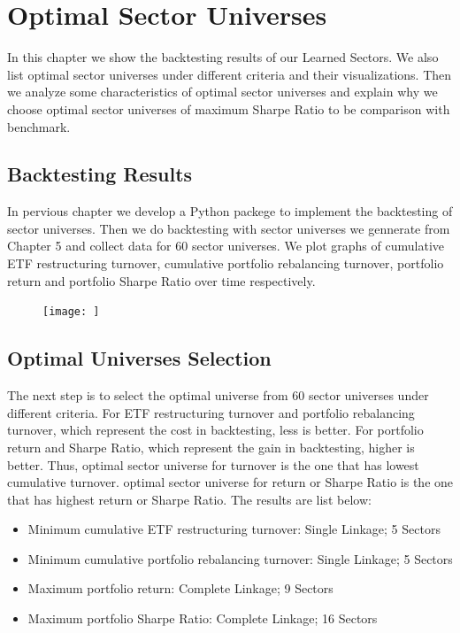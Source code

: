 \documentclass[../main.tex]{subfiles}
\begin{document}
    
\chapter{Optimal Sector Universes}

In this chapter we show the backtesting results of our Learned Sectors. We also list optimal sector universes under different criteria and their visualizations. Then we analyze some characteristics of optimal sector universes and explain why we choose optimal sector universes of maximum Sharpe Ratio to be comparison with benchmark. 

\section{Backtesting Results}

In pervious chapter we develop a Python packege to implement the backtesting of sector universes. Then we do backtesting with sector universes we gennerate from Chapter 5 and collect data for 60 sector universes. We plot graphs of cumulative ETF restructuring turnover, cumulative portfolio rebalancing turnover, portfolio return and portfolio Sharpe Ratio over time respectively. 

\begin{figure}[H]
    \texttt{[image: ]}
    \caption{}
    \label{}
\end{figure} 

\section{Optimal Universes Selection}

The next step is to select the optimal universe from 60 sector universes under different criteria. For ETF restructuring turnover and portfolio rebalancing turnover, which represent the cost in backtesting, less is better. For portfolio return and Sharpe Ratio, which represent the gain in backtesting, higher is better. Thus, optimal sector universe for turnover is the one that has lowest cumulative turnover. optimal sector universe for return or Sharpe Ratio is the one that has highest return or Sharpe Ratio. The results are list below: 

\begin{itemize}
	\item Minimum cumulative ETF restructuring turnover: Single Linkage; 5 Sectors
	\item Minimum cumulative portfolio rebalancing turnover: Single Linkage; 5 Sectors
	\item Maximum portfolio return: Complete Linkage; 9 Sectors
	\item Maximum portfolio Sharpe Ratio: Complete Linkage; 16 Sectors
\end{itemize}
    
\end{document}
